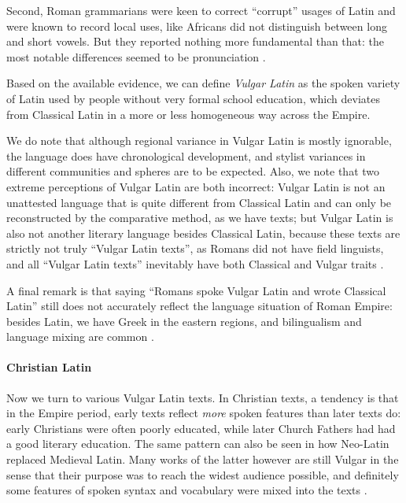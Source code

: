 \documentclass[a4paper, oneside, 12pt]{report}
\newcommand*{\citesec}[1]{\S~{#1}}
\newcommand*{\citepage}[1]{p.~{#1}}
\newcommand*{\citepages}[1]{pp.~{#1}}
\newcommand*{\term}[1]{\emph{#1}}
\begin{document}
Second, Roman grammarians were keen to correct ``corrupt'' usages of Latin 
and were known to record local uses, 
like Africans did not distinguish between long and short vowels.
But they reported nothing more fundamental than that:
the most notable differences seemed to be pronunciation
\citep[\citepage{118}]{herman2010vulgar}.

Based on the available evidence,
we can define \term{Vulgar Latin} as the spoken variety of Latin
used by people without very formal school education,
which deviates from Classical Latin in a more or less homogeneous way across the Empire.

We do note that although regional variance in Vulgar Latin is mostly ignorable,
the language does have chronological development, 
and stylist variances in different communities and spheres are to be expected.
Also, we note that two extreme perceptions of Vulgar Latin are both incorrect: 
Vulgar Latin is not an unattested language
that is quite different from Classical Latin and can only be reconstructed by the comparative method,
as we have texts;
but Vulgar Latin is also not another literary language besides Classical Latin, 
because these texts are strictly not truly ``Vulgar Latin texts'',
as Romans did not have field linguists,
and all ``Vulgar Latin texts'' inevitably have both Classical and Vulgar traits
\citep[\citepages{8,26}]{herman2010vulgar}.

A final remark is that 
saying ``Romans spoke Vulgar Latin and wrote Classical Latin'' 
still does not accurately reflect the language situation of Roman Empire:
besides Latin, we have Greek in the eastern regions,
and bilingualism and language mixing are common
\citep[\citesec{7.2}]{clackson2011blackwell}.

\paragraph*{Christian Latin}
Now we turn to various Vulgar Latin texts.
In Christian texts, a tendency is that in the Empire period,
early texts reflect \emph{more} spoken features than later texts do:
early Christians were often poorly educated,
while later Church Fathers had had a good literary education.
The same pattern can also be seen in how Neo-Latin replaced Medieval Latin.
Many works of the latter however are still Vulgar
in the sense that their purpose was to reach the widest audience possible,
and definitely some features of spoken syntax and vocabulary were mixed into the texts
\citep[\citepage{24}]{herman2010vulgar}.
\end{document}
